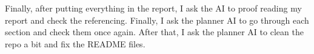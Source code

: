 \documentclass{article}
\begin{document}
Finally, after putting everything in the report, I ask the AI to proof reading my report and check the referencing. Finally, I ask the planner AI to go through each section and check them once again. After that, I ask the planner AI to clean the repo a bit and fix the README files.
\newpage{}


\end{document}
